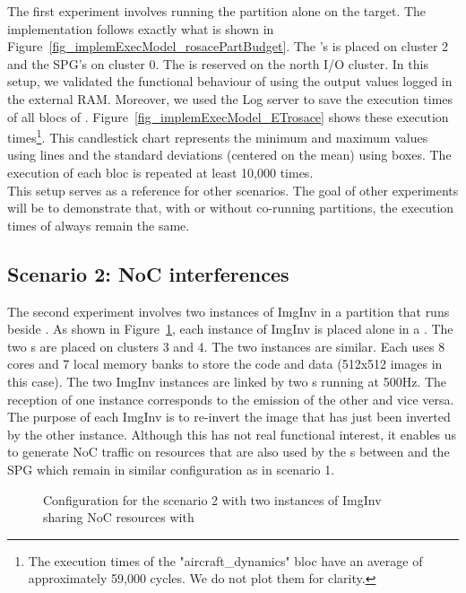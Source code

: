 \documentclass[main.tex]{subfiles}
\begin{document}
The first experiment involves running the \rosace partition alone on the
target. The implementation follows exactly what is shown in
Figure~\ref{fig_implemExecModel_rosacePartBudget}. The \rosace's \PN{} is
placed on cluster 2 and the SPG's \PN{} on cluster 0. The \ION{} is reserved on
the north I/O cluster. In this setup, we validated the functional behaviour of
\rosace using the output values logged in the external RAM. Moreover, we used
the Log server to save the execution times of all blocs of \rosace.
Figure~\ref{fig_implemExecModel_ETrosace} shows these execution
times\footnote{The execution times of the "aircraft\_dynamics" bloc have an
average of approximately 59,000 cycles. We do not plot them for clarity.}. This
candlestick chart represents the minimum and maximum values using lines and the
standard deviations (centered on the mean) using boxes. The execution of each
bloc is repeated at least 10,000 times.\\

This setup serves as a reference for other scenarios. The goal of other
experiments will be to demonstrate that, with or without co-running partitions,
the execution times of \rosace always remain the same.




\subsection{Scenario 2: NoC interferences} 
The second experiment involves two
instances of ImgInv in a partition that runs beside \rosace. As shown in
Figure~\ref{fig_implemExecModel_scenario2budget}, each instance of ImgInv is
placed alone in a \PN{}. The two \PN{}s are placed on clusters 3 and 4. The two
instances are similar. Each uses 8 cores and 7 local memory banks to store the
code and data (512x512 images in this case). The two ImgInv instances are
linked by two \PC{}s running at 500Hz. The reception \PC{} of one instance
corresponds to the emission \PC{} of the other and vice versa. The purpose of
each ImgInv is to re-invert the image that has just been inverted by the other
instance. Although this has not real functional interest, it enables us to
generate NoC traffic on resources that are also used by the \PC{}s between
\rosace and the SPG which remain in similar configuration as in scenario 1. 

\begin{figure}
    \centering
    \scalebox{0.7}{}
    \caption{Configuration for the scenario 2 with two instances of ImgInv sharing NoC resources with \rosace}
    \label{fig_implemExecModel_scenario2budget}
\end{figure}
\end{document}
